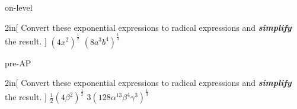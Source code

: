 \begin{taggedblock}{on-level}
    \begin{my2Problems}{2in}[%
        Convert these exponential expressions to radical expressions
        and \textbf{\itshape simplify} the result.
        ]%
        {
            $ \left( 4x^2 \right)^{\frac{1}{2}}$ 
        }
        {
            $ \left( 8a^3b^4 \right)^\frac{1}{3}$ 
        }
    \end{my2Problems}
\end{taggedblock}
\begin{taggedblock}{pre-AP}
    \begin{my2Problems}{2in}[%
        Convert these exponential expressions to radical expressions
        and \textbf{\itshape simplify} the result.
        ]%
        {
            \Large $ \frac{1}{2} \left( 4\beta^2 \right)^{\frac{1}{2}}$ 
        }
        {
            \Large $ 3 \left( 128\alpha^{13}\beta^4\gamma^3 \right)^\frac{1}{3}$ 
        }
    \end{my2Problems}
\end{taggedblock}


